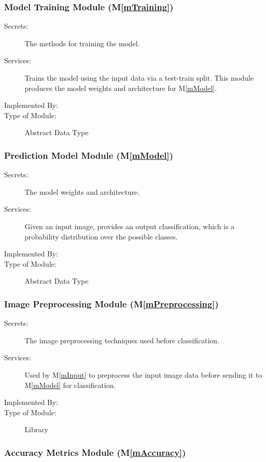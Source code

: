 \documentclass[12pt, titlepage]{article}
\newcommand{\mref}[1]{M\ref{#1}}
\begin{document}
\subsubsection{Model Training Module (\mref{mTraining})}

\begin{description}
\item[Secrets:] The methods for training the model.
\item[Services:] Trains the model using the input data via a test-train split.
This module produces the model weights and architecture for \mref{mModel}.
\item[Implemented By:] \progname{}
\item[Type of Module:] Abstract Data Type
\end{description}

\subsubsection{Prediction Model Module (\mref{mModel})}

\begin{description}
\item[Secrets:] The model weights and architecture.
\item[Services:] Given an input image, provides an output classification, which
is a probability distribution over the possible classes.
\item[Implemented By:] \progname{}
\item[Type of Module:] Abstract Data Type
\end{description}

\subsubsection{Image Preprocessing Module (\mref{mPreprocessing})}

\begin{description}
\item[Secrets:] The image preprocessing techniques used before classification.
\item[Services:] Used by \mref{mInput} to preprocess the input image data before
sending it to \mref{mModel} for classification.
\item[Implemented By:] \progname{}
\item[Type of Module:] Library
\end{description}

\subsubsection{Accuracy Metrics Module (\mref{mAccuracy})}
\end{document}
